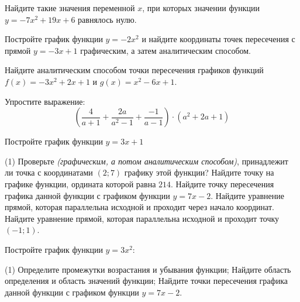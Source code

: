 \begin{homework}[number=3]
	\begin{listofex}
		\item Найдите такие значения переменной \( x \), при которых значении функции \( y=-7x^2+19x+6 \) равнялось нулю.
		\item Постройте график функции \( y=-2x^2 \) и найдите координаты точек пересечения с прямой \( y=-3x+1 \) графическим, а затем аналитическим способом.
		\item Найдите аналитическим способом точки пересечения графиков функций \(f(x)=-3x^2+2x+1\)	и \( g(x)=x^2-6x+1 \).
		\item Упростите выражение: \[ \left( \dfrac{4}{a+1}+\dfrac{2a}{a^2-1}+\dfrac{-1}{a-1} \right)\cdot(a^2+2a+1) \]
	\end{listofex}
\end{homework}

\begin{class}[number=7]
	\begin{listofex}
		\item Постройте график функции \( y=3x+1 \)
		\begin{tasks}(1)
			\task Проверьте \textit{(графическим, а потом аналитическим способом)}, принадлежит ли точка с координатами \( (2;7) \) графику этой функции?
			\task Найдите точку на графике функции, ордината которой равна \( 214 \).
			\task Найдите точку пересечения графика данной функции с графиком функции \( y=7x-2 \).
			\task Найдите уравнение прямой, которая параллельна исходной и проходит через начало координат.
			\task Найдите уравнение прямой, которая параллельна исходной и проходит точку \( (-1;1) \).
		\end{tasks}
		\item Постройте график функции \( y=3x^2 \):
		\begin{tasks}(1)
			\task Определите промежутки возрастания и убывания функции;
			\task Найдите область определения и область значений функции;
			\task Найдите точки пересечения графика данной функции с графиком функции \( y=7x-2 \).
			\end{tasks}
	\end{listofex}
\end{class}

